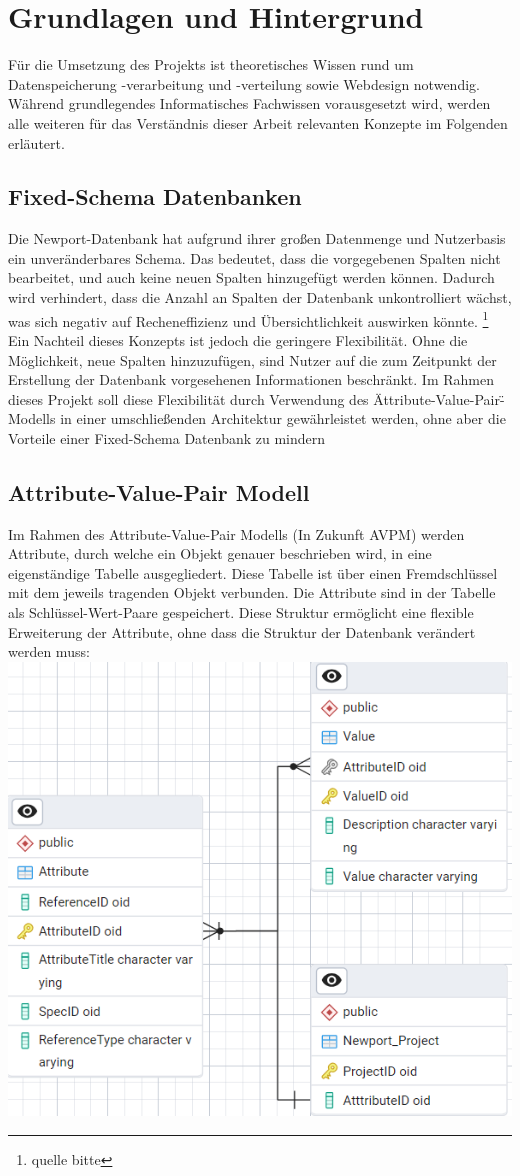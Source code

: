 \section{Grundlagen und Hintergrund}
Für die Umsetzung des Projekts ist theoretisches Wissen rund um Datenspeicherung -verarbeitung und -verteilung 
sowie Webdesign notwendig. Während grundlegendes Informatisches Fachwissen vorausgesetzt wird,
werden alle weiteren für das Verständnis dieser Arbeit relevanten Konzepte im Folgenden erläutert.
\subsection{Fixed-Schema Datenbanken}
Die Newport-Datenbank hat aufgrund ihrer großen Datenmenge und Nutzerbasis ein unveränderbares Schema.
Das bedeutet, dass die vorgegebenen Spalten nicht bearbeitet, und auch keine neuen Spalten hinzugefügt werden können.
Dadurch wird verhindert, dass die Anzahl an Spalten der Datenbank unkontrolliert wächst, was sich negativ auf Recheneffizienz
und Übersichtlichkeit auswirken könnte. \footnote{quelle bitte}
Ein Nachteil dieses Konzepts ist jedoch die geringere Flexibilität. Ohne die Möglichkeit, neue Spalten hinzuzufügen, 
sind Nutzer auf die zum Zeitpunkt der Erstellung der Datenbank vorgesehenen Informationen beschränkt.
Im Rahmen dieses Projekt soll diese Flexibilität durch Verwendung des \"Attribute-Value-Pair\"-Modells in einer umschließenden
Architektur gewährleistet werden, ohne aber die Vorteile einer Fixed-Schema Datenbank zu mindern
\subsection{Attribute-Value-Pair Modell}
Im Rahmen des Attribute-Value-Pair Modells (In Zukunft AVPM) werden Attribute, durch welche ein Objekt genauer beschrieben wird,
in eine eigenständige Tabelle ausgegliedert. Diese Tabelle ist über einen Fremdschlüssel mit dem jeweils tragenden Objekt verbunden.
Die Attribute sind in der Tabelle als Schlüssel-Wert-Paare gespeichert. Diese Struktur ermöglicht eine flexible Erweiterung der Attribute,  
ohne dass die Struktur der Datenbank verändert werden muss: \break
\includegraphics{./img/avpmGraphic.png}
